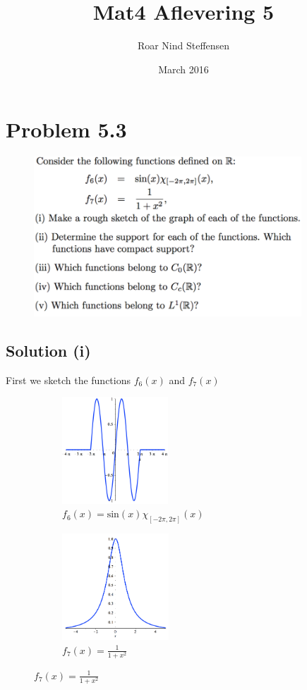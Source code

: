 \documentclass{article}
\title{Mat4 Aflevering 5}
\author{Roar Nind Steffensen}
\date{March 2016}
\begin{document}
\maketitle

\section*{Problem 5.3}
\begin{figure}[H]
    \centering
    \includegraphics[height=6cm]{fig/prob53}
\end{figure}
\vspace{-0.5cm}
\subsection*{Solution (i)}
First we sketch the functions $f_6(x)$ and $f_7(x)$ \\
\begin{figure}[H]
\centering
    \begin{subfigure}{0.495\textwidth}
    \includegraphics[width=0.9\linewidth, height=4cm]{fig/f6}
    \caption*{$f_6(x)=\text{sin}(x)\chi_{[-2 \pi,2 \pi]}(x)$}
    \end{subfigure}
    \begin{subfigure}{0.495\textwidth}
    \includegraphics[width=0.9\linewidth, height=4cm]{fig/f7}
    \caption*{$f_7(x)=\frac{1}{1+x^2}$}
    \end{subfigure}
\end{figure}
\end{document}
